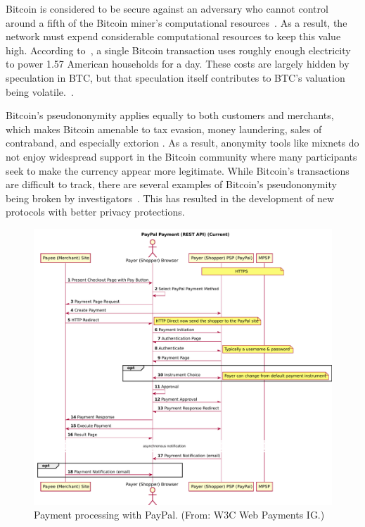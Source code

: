 \documentclass{llncs}
\begin{document}
Bitcoin is considered to be secure against an adversary who cannot
control around a fifth of the Bitcoin miner's computational
resources~\cite{BTC:Bahack13,BTC:MajorityNotEnough,BTC:Eclipse}.  %
As a result, the network must expend considerable computational
resources to keep this value high.
According to~\cite{vice_btc_unsustainable}, a single Bitcoin transaction uses roughly enough
electricity to power 1.57 American households for a day.
These costs are largely hidden by speculation in BTC,
but that speculation itself contributes to BTC's valuation being
volatile.~\cite{jeffries_economists_v_btc,lehmann_btc_fools_gold,lewis_btc_is_junk}. %


Bitcoin's pseudononymity applies equally to both customers and
merchants, which makes Bitcoin amen\-able to tax evasion, money
laundering, sales of contraband, and especially extorion
 \cite{NYA:CyberExtortionRisk}.
As a result, anonymity tools like mixnets do not enjoy widespread
support in the Bitcoin community where many participants seek to make
the currency appear more legitimate.  While Bitcoin's transactions
are difficult to track, there are several examples of Bitcoin's
pseudononymity being broken by investigators~\cite{BTC:Anonymity}.
This has resulted in the development of new protocols with better
privacy protections.

\begin{figure}[t!]
\includegraphics[width=\textwidth]{figs/paypal.pdf}
\caption{Payment processing with PayPal. (From: W3C Web Payments IG.)}
\label{fig:paypal}
\end{figure}
\end{document}
